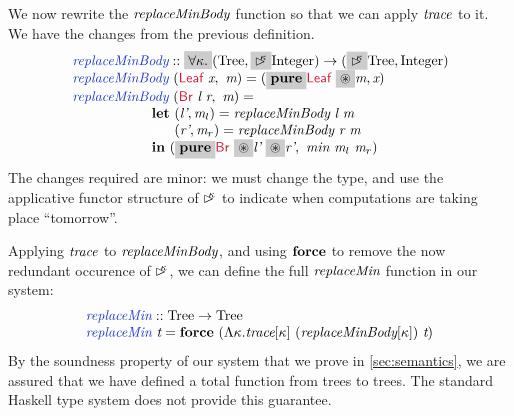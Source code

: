 We now rewrite the $\textit{replaceMinBody}$ function so that we can
apply $\textit{trace}$ to it. We have  the
changes from the previous definition.
\begin{displaymath}
  \begin{array}{l}
    \defn{replaceMinBody} :: \hlchangem{\forall \kappa.}(\tyname{Tree},\hlchangem{\delay\kappa}\tyname{Integer}) \to (\hlchangem{\delay\kappa}\tyname{Tree},\tyname{Integer}) \\
    \hspace{0cm} \defn{replaceMinBody}\ (\cons{Leaf}\ \ident{x},\ \ident{m}) = (\hlchangem{\kw{pure}}\cons{Leaf}\ \hlchangem{\circledast}\ident{m}, \ident{x}) \\
    \hspace{0cm} \defn{replaceMinBody}\ (\cons{Br}\ \ident{l}\ \ident{r},\ \ident{m}) = \\
    \hspace{2cm} \kw{let}\ (\ident{l'}, \ident{m$_l$}) = \ident{replaceMinBody}\ \ident{l}\ \ident{m} \\
    \hspace{2cm} \textcolor{white}{\kw{let}\ }(\ident{r'}, \ident{m$_r$}) = \ident{replaceMinBody}\ \ident{r}\ \ident{m} \\
    \hspace{2cm} \kw{in}\ (\hlchangem{\kw{pure}}\cons{Br}\ \hlchangem{\circledast}\ident{l'}\ \hlchangem{\circledast}\ident{r'},\ \ident{min}\ \ident{m$_l$}\ \ident{m$_r$})
  \end{array}
\end{displaymath}
The changes required are minor: we must change the type, and use the
applicative functor structure of $\mathord{\rhd\kern-0.4em^{\kappa}}$ to indicate when
computations are taking place ``tomorrow''.

Applying $\textit{trace}$ to $\textit{replaceMinBody}$, and using
$\textbf{force}$ to remove the now redundant occurence of $\mathord{\rhd\kern-0.4em^{\kappa}}$,
we can define the full $\textit{replaceMin}$ function in our system:
\begin{displaymath}
  \begin{array}{l}
    \defn{replaceMin} :: \tyname{Tree} \to \tyname{Tree} \\
    \defn{replaceMin}\ \ident{t} = \kw{force}\ (\Lambda \kappa. \ident{trace}[\kappa]\ (\ident{replaceMinBody}[\kappa])\ \ident{t})
  \end{array}
\end{displaymath}
By the soundness property of our system that we prove in
\autoref{sec:semantics}, we are assured that we have defined a total
function from trees to trees. The standard Haskell type system does
not provide this guarantee.

